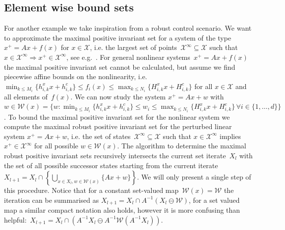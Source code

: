 \documentclass[final]{elsarticle}
\theoremstyle{remark}
\theoremstyle{definition}
\begin{document}
\subsection{Element wise bound sets}\label{exp:second:example}
%
For another example we take inspiration from a robust control scenario.
%
We want to approximate the maximal positive invariant set for a system of the type~$x^+=Ax + f(x)$ for $x\in\mathcal X$, i.e. the largest set of points~$\mathcal X^\infty\subseteq\mathcal X$ such that $x\in\mathcal X^\infty\Rightarrow x^+\in\mathcal X^\infty$, see e.g.~\cite{blanchini:2007}.
%
For general nonlinear systems~$x^+=Ax + f(x)$ the maximal positive invariant set cannot be calculated, but assume we find piecewise affine bounds on the nonlinearity, i.e. $\min_{k\leq M_i}\{h_{i,k}^x x + h_{i,k}^c\}\leq f_i(x)\leq\max_{k\leq N_i}\{H_{i,k}^x x + H_{i,k}^c\}$ for all $x\in\mathcal X$ and all elements of~$f(x)$.
%
We can now study the system $x^+=Ax+w$ with $w\in\mathcal W(x) = \{w:\min_{k\leq M_i}\{h_{i,k}^x x + h_{i,k}^c\}\leq w_i\leq\max_{k\leq N_i}\{H_{i,k}^x x + H_{i,k}^c\}\,\forall i\in\{1,\dots,d\}\}$.
%
To bound the maximal positive invariant set for the nonlinear system we compute the maximal robust positive invariant set for the perturbed linear system $x^+=Ax+w$, i.e. the set of states~$\mathscr X^\infty\subseteq\mathcal X$ such that $x\in\mathscr X^\infty$ implies $x^+\in\mathscr X^\infty$ for all possible $w\in\mathcal W(x)$.
%
The algorithm to determine the maximal robust positive invariant sets recursively intersects the current set iterate~$X_l$ with the set of all possible successor states starting from the current iterate $X_{l+1}=X_l\cap\left\{\bigcup_{x\in X_l,w\in\mathcal W(x)}\{Ax+w\}\right\}$.
%
We will only present a single step of this procedure.
%
Notice that for a constant set-valued map~$\mathcal W(x) = \mathcal W$ the iteration can be summarised as $X_{l+1} = X_l\cap A^{-1}(X_l\ominus\mathcal W)$, for a set valued map a similar compact notation also holds, however it is more confusing than helpful:~$X_{l+1}=X_l\cap(A^{-1}X_l\ominus A^{-1}\mathcal W(A^{-1}X_l))$.
\end{document}
